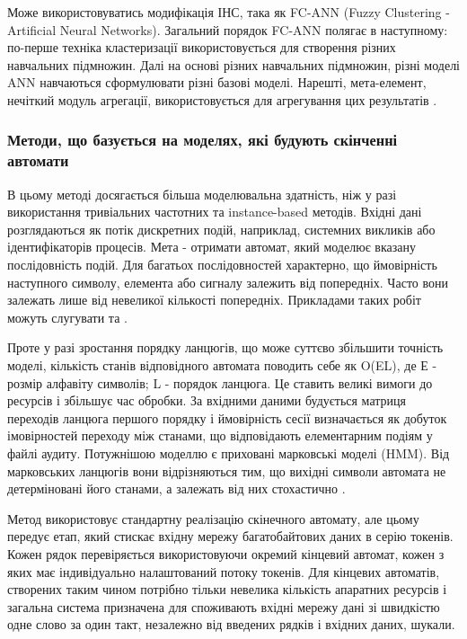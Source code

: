 Може використовуватись модифікація ІНС, така як FC-ANN (Fuzzy Clustering - Artificial Neural Networks). Загальний порядок FC-ANN полягає в наступному: по-перше техніка кластеризації використовується для створення різних навчальних підмножин. Далі на основі різних навчальних підмножин, різні моделі ANN навчаються сформулювати різні базові моделі. Нарешті, мета-елемент, нечіткий модуль агрегації, використовується для агрегування цих результатів \cite{gaikwad2012anomaly}.

\subsubsection{Методи, що базується на моделях, які будують скінченні автомати}

В цьому методі досягається більша моделювальна здатність, ніж у разі використання тривіальних частотних та instance-based методів. Вхідні дані розглядаються як потік дискретних подій, наприклад, системних викликів або ідентифікаторів процесів. Мета - отримати автомат, який моделює вказану послідовність подій. Для багатьох послідовностей характерно, що ймовірність наступного символу, елемента або сигналу залежить від попередніх. Часто вони залежать лише від невеликої кількості попередніх. Прикладами таких робіт можуть слугувати \cite{chen2006detecting} та \cite{gerald2005finitestate}.

Проте у разі зростання порядку ланцюгів, що може суттєво збільшити точність моделі, кількість станів відповідного автомата поводить себе як O(EL), де Е - розмір алфавіту символів; L - порядок ланцюга. Це ставить великі вимоги до ресурсів і збільшує час обробки. За вхідними даними будується матриця переходів ланцюга першого порядку і ймовірність сесії визначається як добуток імовірностей переходу між станами, що відповідають елементарним подіям у файлі аудиту. Потужнішою моделлю є приховані марковські моделі (HMM). Від марковських ланцюгів вони відрізняються тим, що вихідні символи автомата не детерміновані його станами, а залежать від них стохастично \cite{davison1998predicting}.

Метод \cite{gerald2005finitestate} використовує стандартну реалізацію скінечного автомату, але цьому передує етап, який стискає вхідну мережу багатобайтових даних в серію токенів. Кожен рядок перевіряється використовуючи окремий кінцевий автомат, кожен з яких має індивідуально налаштований потоку токенів. Для кінцевих автоматів, створених таким чином потрібно тільки невелика кількість апаратних ресурсів і загальна система призначена для споживають вхідні мережу дані зі швидкістю одне слово за один такт, незалежно від введених рядків і вхідних даних, шукали.

